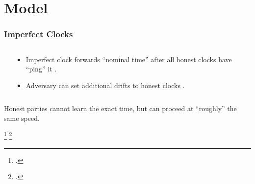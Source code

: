 \section{Model}



\begin{frame}
    \frametitle{Imperfect Clocks}

    \begin{columns}[c, onlytextwidth]
        \begin{column}{0.6\textwidth} \centering {} \end{column}
        \begin{column}{0.4\textwidth}
            \begin{itemize}
                \item Imperfect clock forwards ``nominal time'' after all honest clocks have ``ping'' it \cite{uc-synchronous-clock}.
                \item Adversary can set additional drifts to honest clocks \cite{ouroboros-chronos}.
            \end{itemize}
        \end{column}
    \end{columns}

    \begin{center}
        Honest parties cannot learn the exact time, but can proceed at ``roughly'' the same speed.
    \end{center}

    \footcite{uc-synchronous-clock}
    \footcite{ouroboros-chronos}
\end{frame}

